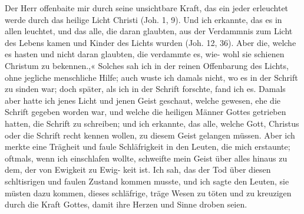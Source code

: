 Der Herr offenbaite mir durch seine unsichtbare Kraft, das
ein jeder erleuchtet werde durch das heilige Licht Christi (Joh. 1, 9).
Und ich erkannte, das es in allen leuchtet, und das alle, die
daran glaubten, aus der Verdammnis zum Licht des Lebens
kamen und Kinder des Lichts wurden (Joh. 12, 36). Aber die,
welche es hasten und nicht daran glaubten, die verdammte es, wie-
wohl sie schienen Christum zu bekennen.,« Solches sah ich in der
reinen Offenbarung des Lichts, ohne jegliche menschliche Hilfe;
auch wuste ich damals nicht, wo es in der Schrift zu sinden
war; doch später, als ich in der Schrift forschte, fand ich es.
Damals aber hatte ich jenes Licht und jenen Geist geschaut, welche
gewesen, ehe die Schrift gegeben worden war, und welche die
heiligen Männer Gottes getrieben hatten, die Schrift zu schreiben;
und ich erkannte, das alle, welche Gott, Christus oder die Schrift
recht kennen wollen, zu diesem Geist gelangen müssen. Aber ich
merkte eine Trägheit und faule Schläfrigkeit in den Leuten, die
mich erstaunte; oftmals, wenn ich einschlafen wollte, schweifte
mein Geist über alles hinaus zu dem, der von Ewigkeit zu Ewig-
keit ist. Ich sah, das der Tod über diesen schltisrigen und faulen
Zustand kommen musste, und ich sagte den Leuten, sie müsten
dazu kommen, dieses schläfrige, träge Wesen zu töten und zu
kreuzigen durch die Kraft Gottes, damit ihre Herzen und Sinne
droben seien.


